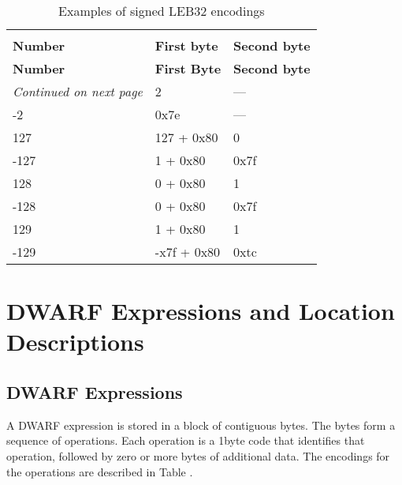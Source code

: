 \begin{centering}
\setlength{\extrarowheight}{0.1cm}
\begin{longtable}{l|l|l}
  \caption{Examples of signed LEB32 encodings} \label{tab:examplesofsignedleb128encodings} \\
  \hline \\ \bfseries Number&\bfseries First byte &\bfseries Second byte \\ \hline
\endfirsthead
  \bfseries Number&\bfseries First Byte &\bfseries Second byte\\ \hline
\endhead
  \hline \emph{Continued on next page}
\endfoot
  \hline
\endlastfoot
2&2& --- \\
-2&0x7e& ---\\
127& 127 + 0x80 & 0 \\
-127& 1 + 0x80 & 0x7f \\
128& 0 + 0x80 & 1 \\
-128& 0 + 0x80 & 0x7f \\
129& 1 + 0x80 & 1 \\
-129& -x7f + 0x80 & 0xtc \\

\end{longtable}
\end{centering}



\section{DWARF Expressions and Location Descriptions}
\label{datarep:dwarfexpressionsandlocationdescriptions}
\subsection{DWARF Expressions}
\label{datarep:dwarfexpressions}

A DWARF expression is stored in a block of contiguous
bytes. The bytes form a sequence of operations. Each operation
is a 1\dash byte code that identifies that operation, followed by
zero or more bytes of additional data. The encodings for the
operations are described in 
Table . 

